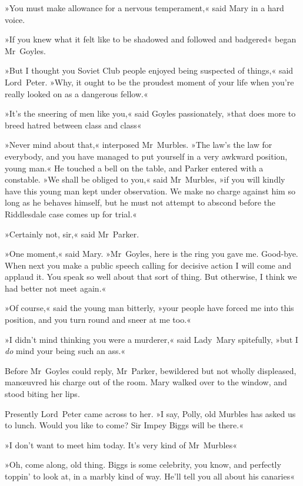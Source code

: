 »You must make allowance for a nervous temperament,« said Mary in a hard voice.

»If you knew what it felt like to be shadowed and followed and badgered\longdash« began Mr~Goyles.

»But I thought you Soviet Club people enjoyed being suspected of things,« said Lord~Peter. »Why, it ought to be the proudest moment of your life when you're really looked on as a dangerous fellow.«

»It's the sneering of men like you,« said Goyles passionately, »that does more to breed hatred between class and class\longdash«

»Never mind about that,« interposed Mr~Murbles. »The law's the law for everybody, and you have managed to put yourself in a very awkward position, young man.« He touched a bell on the table, and Parker entered with a constable. »We shall be obliged to you,« said Mr~Murbles, »if you will kindly have this young man kept under observation. We make no charge against him so long as he behaves himself, but he must not attempt to abscond before the Riddlesdale case comes up for trial.«

»Certainly not, sir,« said Mr~Parker.

»One moment,« said Mary. »Mr~Goyles, here is the ring you gave me.  Good-bye. When next you make a public speech calling for decisive action I will come and applaud it. You speak so well about that sort of thing. But otherwise, I think we had better not meet again.«

»Of course,« said the young man bitterly, »your people have forced me into this position, and you turn round and sneer at me too.«

»I didn't mind thinking you were a murderer,« said Lady~Mary spitefully, »but I \textit{do} mind your being such an ass.«

Before Mr~Goyles could reply, Mr~Parker, bewildered but not wholly displeased, manœuvred his charge out of the room. Mary walked over to the window, and stood biting her lips.

Presently Lord~Peter came across to her. »I say, Polly, old Murbles has asked us to lunch. Would you like to come? Sir Impey Biggs will be there.«

»I don't want to meet him today. It's very kind of Mr~Murbles\longdash«

»Oh, come along, old thing. Biggs is some celebrity, you know, and perfectly toppin' to look at, in a marbly kind of way. He'll tell you all about his canaries\longdash«

